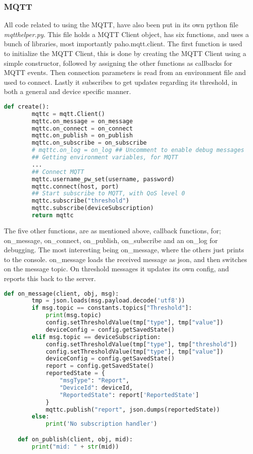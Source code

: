 \subsubsection*{MQTT}
All code related to using the MQTT, have also been put in its own python file \textit{mqtthelper.py}. This file holds a MQTT Client object, has six functions, and uses a bunch of libraries, most importantly paho.mqtt.client. The first function is used to initialize the MQTT Client, this is done by creating the MQTT Client using a simple constructor, followed by assigning the other functions as callbacks for MQTT events. Then connection parameters is read from an environment file and used to connect. Lastly it subscribes to get updates regarding its threshold, in both a general and device specific manner.
\begin{lstlisting}[language=Python, caption=Python MQTT setup, label={lst:rpmqtt}, basicstyle=\scriptsize]
    def create():
        mqttc = mqtt.Client()
        mqttc.on_message = on_message
        mqttc.on_connect = on_connect
        mqttc.on_publish = on_publish
        mqttc.on_subscribe = on_subscribe
        # mqttc.on_log = on_log ## Uncomment to enable debug messages
        ## Getting environment variables, for MQTT
        ...
        ## Connect MQTT
        mqttc.username_pw_set(username, password)
        mqttc.connect(host, port)
        ## Start subscribe to MQTT, with QoS level 0
        mqttc.subscribe("threshold")
        mqttc.subscribe(deviceSubscription)
        return mqttc
\end{lstlisting}
The five other functions, are as mentioned above, callback functions, for; on\_message, on\_connect, on\_publish, on\_subscribe and an on\_log for debugging. The most interesting being on\_message, where the others just prints to the console. on\_message loads the received message as json, and then switches on the message topic. On threshold messages it updates its own config, and reports this back to the server.
\begin{lstlisting}[language=Python, caption=MQTT handler examples, label={lst:rpmqtthe}, basicstyle=\scriptsize]
    def on_message(client, obj, msg):
        tmp = json.loads(msg.payload.decode('utf8'))
        if msg.topic == constants.topics["Threshold"]:
            print(msg.topic)
            config.setThresholdValue(tmp["type"], tmp["value"])
            deviceConfig = config.getSavedState()
        elif msg.topic == deviceSubscription:
            config.setThresholdValue(tmp["type"], tmp["threshold"])
            config.setThresholdValue(tmp["type"], tmp["value"])
            deviceConfig = config.getSavedState()
            report = config.getSavedState()
            reportedState = {
                "msgType": "Report",
                "DeviceId": deviceId,
                "ReportedState": report['ReportedState']
            }
            mqttc.publish("report", json.dumps(reportedState))
        else:
            print('No subscription handler')

    def on_publish(client, obj, mid):
        print("mid: " + str(mid))
\end{lstlisting}